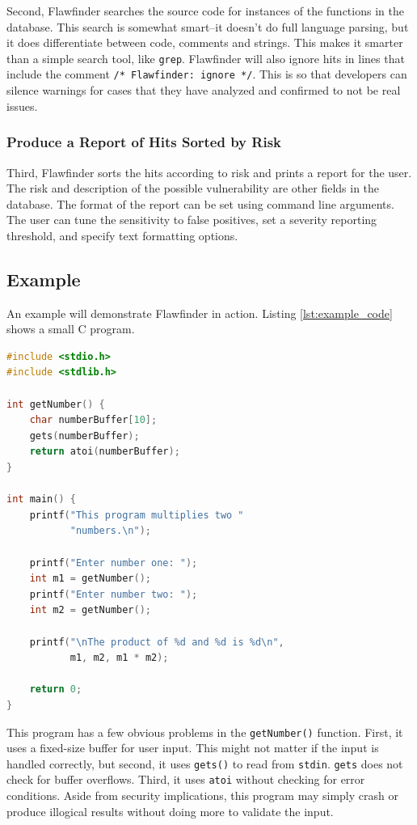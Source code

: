 \documentclass[journal]{IEEEtran}
\def\tt#1{\mbox{\texttt{#1}}}
\begin{document}
Second, Flawfinder searches the source code for instances of the functions in the database. This
search is somewhat smart--it doesn't do full language parsing, but it does differentiate between
code, comments and strings. This makes it smarter than a simple search tool, like \tt{grep}.
Flawfinder will also ignore hits in lines that include the comment \tt{/* Flawfinder: ignore */}.
This is so that developers can silence warnings for cases that they have analyzed and confirmed to
not be real issues.

\subsubsection{Produce a Report of Hits Sorted by Risk}

Third, Flawfinder sorts the hits according to risk and prints a report for the user. The risk and
description of the possible vulnerability are other fields in the database. The format of the report
can be set using command line arguments. The user can tune the sensitivity to false positives, set
a severity reporting threshold, and specify text formatting options.

\subsection{Example}

An example will demonstrate Flawfinder in action. Listing \ref{lst:example_code} shows a small C
program.

\begin{lstlisting}[language=c, caption=C Example Program, label=lst:example_code]
#include <stdio.h>
#include <stdlib.h>

int getNumber() {
    char numberBuffer[10];
    gets(numberBuffer);
    return atoi(numberBuffer);
}

int main() {
    printf("This program multiplies two "
           "numbers.\n");

    printf("Enter number one: ");
    int m1 = getNumber();
    printf("Enter number two: ");
    int m2 = getNumber();

    printf("\nThe product of %d and %d is %d\n",
           m1, m2, m1 * m2);

    return 0;
}
\end{lstlisting}

This program has a few obvious problems in the \tt{getNumber()} function. First, it uses a
fixed-size buffer for user input. This might not matter if the input is handled correctly, but
second, it uses \tt{gets()} to read from \tt{stdin}. \tt{gets} does not check for buffer overflows.
Third, it uses \tt{atoi} without checking for error conditions. Aside from security implications,
this program may simply crash or produce illogical results without doing more to validate the input.
\end{document}
